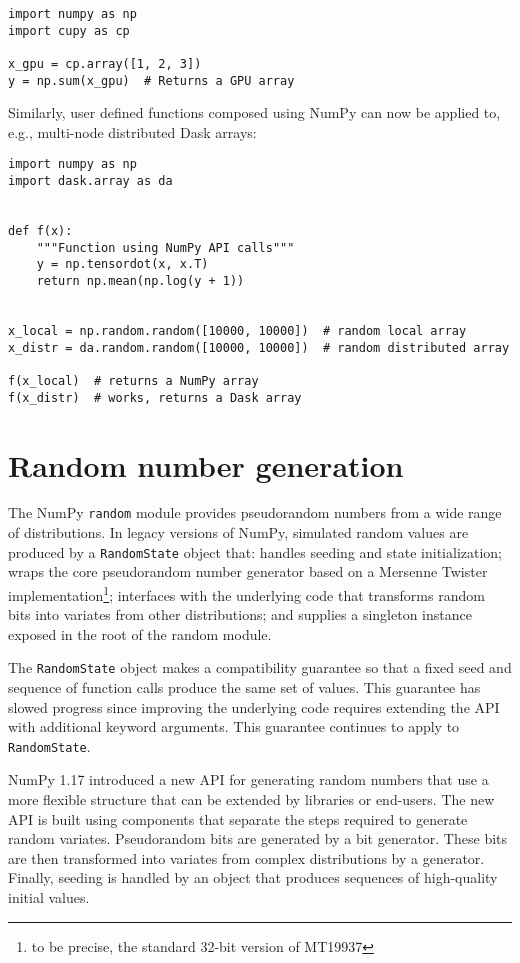 \documentclass{article}
\begin{document}
\begin{lstlisting}
import numpy as np
import cupy as cp

x_gpu = cp.array([1, 2, 3])
y = np.sum(x_gpu)  # Returns a GPU array
\end{lstlisting}

Similarly, user defined functions composed using NumPy can now be
applied to, e.g., multi-node distributed Dask arrays:

\begin{lstlisting}
import numpy as np
import dask.array as da


def f(x):
    """Function using NumPy API calls"""
    y = np.tensordot(x, x.T)
    return np.mean(np.log(y + 1))


x_local = np.random.random([10000, 10000])  # random local array
x_distr = da.random.random([10000, 10000])  # random distributed array

f(x_local)  # returns a NumPy array
f(x_distr)  # works, returns a Dask array
\end{lstlisting}

\section*{Random number generation}

The NumPy \texttt{random} module provides pseudorandom numbers from a wide range of
distributions. In legacy versions of NumPy, simulated random values are produced
by a \texttt{RandomState} object that: handles seeding and state initialization;
wraps the core pseudorandom number generator based on a Mersenne Twister
implementation\footnote{to be precise, the standard 32-bit version of MT19937};
interfaces with the underlying code that transforms random bits into
variates from other distributions; and supplies a singleton instance exposed in
the root of the random module.

The \texttt{RandomState} object makes a compatibility guarantee so that a fixed
seed and sequence of function calls produce the same set of values. This
guarantee has slowed progress since improving the underlying code requires
extending the API with additional keyword arguments. This guarantee continues to
apply to \texttt{RandomState}.

NumPy 1.17 introduced a new API for generating random numbers that use a more
flexible structure that can be extended by libraries or end-users. The new API
is built using components that separate the steps required to generate random
variates. Pseudorandom bits are generated by a bit generator. These bits are
then transformed into variates from complex distributions by a generator.
Finally, seeding is handled by an object that produces sequences of high-quality
initial values.
\end{document}
